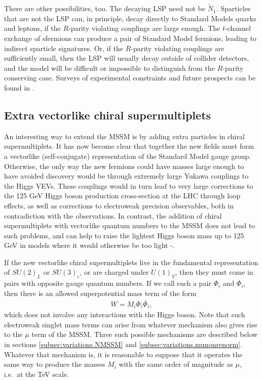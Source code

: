 \documentclass[12pt]{article}
\def\beq{\begin{eqnarray}}
\def\eeq{\end{eqnarray}}
\def\stilde{\widetilde}
\def\NI{\stilde N_1}
\begin{document}
There are other possibilities, too.  The decaying LSP need not be $\NI$.
Sparticles that are not the LSP can, in principle, decay directly to
Standard Models quarks and leptons, if the $R$-parity violating couplings
are large enough. The $t$-channel exchange of sfermions can produce a pair
of Standard Model fermions, leading to indirect sparticle signatures.
Or, if the $R$-parity violating couplings are sufficiently small, then the
LSP will usually decay outside of collider detectors, and the model will
be difficult or impossible to distinguish from the $R$-parity conserving
case. Surveys of experimental constraints and future
prospects can be found in \cite{RPVreviews}. 

\subsection{Extra vectorlike chiral 
supermultiplets}\label{subsec:variations.vectorlike}
\setcounter{equation}{0}

An interesting way to extend the MSSM is by adding extra particles 
in chiral supermultiplets. 
It has now become clear that together 
the new fields must form a vectorlike (self-conjugate) representation 
of the Standard Model gauge group. Otherwise, the only way the new 
fermions could have masses large enough to have avoided discovery would be through
extremely large Yukawa couplings to the Higgs VEVs. 
These couplings would in turn lead to very large 
corrections to the 125 GeV Higgs boson production cross-section at the LHC 
through loop effects, as well as corrections to electroweak precision observables, 
both in contradiction with the observations. In contrast, the addition of
chiral supermultiplets with vectorlike quantum numbers to the MSSM does not lead to such problems, and can help to raise the lightest Higgs boson mass up to 125 GeV
in models where it would otherwise be too light 
\cite{Moroi:1991mg}-\cite{Graham:2009gy}.

If the new vectorlike chiral supermultiplets live in the fundamental representation of 
$SU(2)_L$ or $SU(3)_c$, or are charged under $U(1)_Y$, then they must come in pairs with opposite gauge quantum numbers. 
If we call such a pair 
$\Phi_i$ and $\overline \Phi_i$, then there is an allowed superpotential 
mass term of the form
\beq
W = M_i \Phi_i \overline \Phi_i ,
\label{eq:Wvectorlikemass}
\eeq
which does not involve any interactions with the Higgs boson. Note that 
such electroweak singlet mass terms 
can arise from whatever mechanism also gives rise to the $\mu$ term of the MSSM. Three 
such possible mechanisms are described below in sections \ref{subsec:variations.NMSSM} and
\ref{subsec:variations.munonrenorm}. Whatever that mechanism is, it is 
reasonable to suppose that it operates the same way to produce the masses $M_i$ 
with the same order of magnitude as $\mu$, i.e.~at the TeV scale. 
\end{document}
